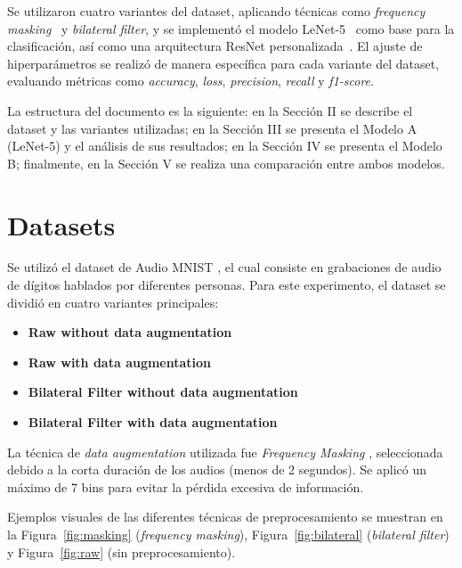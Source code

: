 \documentclass[conference]{IEEEtran}
\begin{document}
Se utilizaron cuatro variantes del dataset, aplicando técnicas como \textit{frequency masking}~\cite{audio_augmentation} y \textit{bilateral filter}, y se implementó el modelo LeNet-5~\cite{lenet5_original} como base para la clasificación, así como una arquitectura ResNet personalizada~\cite{resnet_original}. El ajuste de hiperparámetros se realizó de manera específica para cada variante del dataset, evaluando métricas como \textit{accuracy}, \textit{loss}, \textit{precision}, \textit{recall} y \textit{f1-score}.

La estructura del documento es la siguiente: en la Sección II se describe el dataset y las variantes utilizadas; en la Sección III se presenta el Modelo A (LeNet-5) y el análisis de sus resultados; en la Sección IV se presenta el Modelo B; finalmente, en la Sección V se realiza una comparación entre ambos modelos.



\section{Datasets}
Se utilizó el dataset de Audio MNIST \cite{audio_mnist_kaggle}, el cual consiste en grabaciones de audio de dígitos hablados por diferentes personas. Para este experimento, el dataset se dividió en cuatro variantes principales:

\begin{itemize}
    \item \textbf{Raw without data augmentation}
    \item \textbf{Raw with data augmentation}
    \item \textbf{Bilateral Filter without data augmentation}
    \item \textbf{Bilateral Filter with data augmentation}
\end{itemize}

La técnica de \textit{data augmentation} utilizada fue \textit{Frequency Masking} \cite{freq_masking_torch}, seleccionada debido a la corta duración de los audios (menos de 2 segundos). Se aplicó un máximo de 7 bins para evitar la pérdida excesiva de información.

Ejemplos visuales de las diferentes técnicas de preprocesamiento se muestran en la Figura~\ref{fig:masking} (\textit{frequency masking}), Figura~\ref{fig:bilateral} (\textit{bilateral filter}) y Figura~\ref{fig:raw} (sin preprocesamiento).
\end{document}
